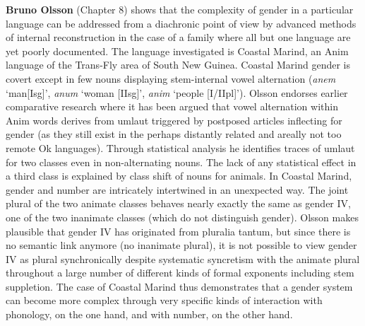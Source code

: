 \documentclass[output=collectionpaper]{langsci/langscibook}
\begin{document}
\textbf{Bruno Olsson} (Chapter 8) shows that the complexity of gender in a particular language can be addressed from a diachronic point of view by advanced methods of internal reconstruction in the case of a family where all but one language are yet poorly documented. The language investigated is Coastal Marind, an Anim language of the Trans-Fly area of South New Guinea. Coastal Marind gender is covert except in few nouns displaying stem-internal vowel alternation (\textit{anem} ‘man[Isg]’, \textit{anum} ‘woman [IIsg]’, \textit{anim} ‘people [I/IIpl]’). Olsson endorses earlier comparative research where it has been argued that vowel alternation within Anim words derives from umlaut triggered by postposed articles inflecting for gender (as they still exist in the perhaps distantly related and areally not too remote Ok languages). Through statistical analysis he identifies traces of umlaut for two classes even in non-alternating nouns. The lack of any statistical effect in a third class is explained by class shift of nouns for animals. In Coastal Marind, gender and number are intricately intertwined in an unexpected way. The joint plural of the two animate classes behaves nearly exactly the same as gender IV, one of the two inanimate classes (which do not distinguish gender). Olsson makes plausible that gender IV has originated from pluralia tantum, but since there is no semantic link anymore (no inanimate plural), it is not possible to view gender IV as plural synchronically despite systematic syncretism with the animate plural throughout a large number of different kinds of formal exponents including stem suppletion. The case of Coastal Marind thus demonstrates that a gender system can become more complex through very specific kinds of interaction with phonology, on the one hand, and with number, on the other hand.
\end{document}
